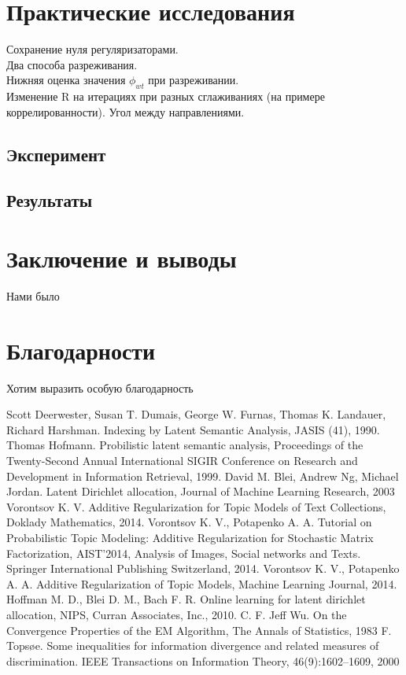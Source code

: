 \documentclass[12pt]{article}
\begin{document}
	\section{Практические исследования}
	Сохранение нуля регуляризаторами.\\
          Два способа разреживания.\\
	Нижняя оценка значения $\phi_{wt}$ при разреживании.\\
	Изменение R на итерациях при разных сглаживаниях (на примере коррелированности). Угол между направлениями. \\
	\subsection{Эксперимент}
	\subsection{Результаты}

	\section{Заключение и выводы}
	Нами было 
	\section{Благодарности}
	Хотим выразить особую благодарность 
\newpage
	\begin{thebibliography}{@@@@}
		Scott Deerwester, Susan T. Dumais, George W. Furnas, Thomas K. Landauer, Richard Harshman. Indexing by Latent Semantic Analysis,  JASIS (41), 1990.
		Thomas Hofmann. Probilistic latent semantic analysis, Proceedings of the Twenty-Second Annual International SIGIR Conference on Research and Development in Information Retrieval, 1999.
		David M. Blei, Andrew Ng, Michael Jordan. Latent Dirichlet allocation, Journal of Machine Learning Research,  2003
		Vorontsov K. V. Additive Regularization for Topic Models of Text Collections, Doklady Mathematics, 2014.
		Vorontsov K. V., Potapenko A. A. Tutorial on Probabilistic Topic Modeling: Additive Regularization for Stochastic Matrix Factorization,  AIST’2014, Analysis of Images, Social networks and Texts. Springer International Publishing Switzerland, 2014.
		Vorontsov K. V., Potapenko A. A. Additive Regularization of Topic Models, Machine Learning Journal, 2014.
		Hoffman M. D., Blei D. M., Bach F. R. Online learning for latent dirichlet allocation, NIPS, Curran Associates, Inc., 2010.
		C. F. Jeff Wu. On the Convergence Properties of the EM Algorithm, The Annals of Statistics, 1983
		F. Topsøe. Some inequalities for information divergence and related measures of discrimination. IEEE Transactions on Information Theory, 46(9):1602–1609, 2000
	\end{thebibliography}
\end{document}
